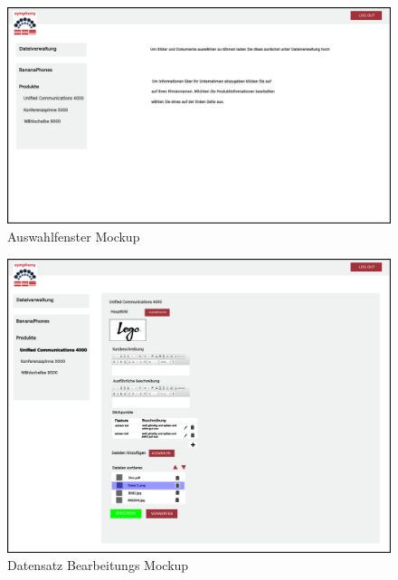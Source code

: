 \documentclass[a4paper,12pt]{article}
\begin{document}
\begin{figure}[!htb]
  \centering
     \includegraphics[width=1.0\textwidth]{projmicro_auswahl.png}
  \caption{Auswahlfenster Mockup}
  \label{fig:selection}
\end{figure}

\begin{figure}[!htb]
  \centering
     \includegraphics[width=1.0\textwidth]{projmicro_edit.png}
  \caption{Datensatz Bearbeitungs Mockup}
  \label{fig:edit}
\end{figure}
\end{document}
